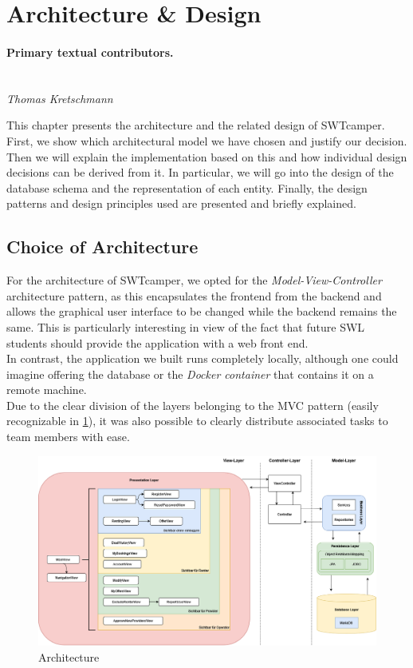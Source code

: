 \section{Architecture \& Design}
\label{sec:architecture_design}

\paragraph{Primary textual contributors.}
\mbox{}\\\emph{Thomas Kretschmann}

This chapter presents the architecture and the related design of SWTcamper. First, we show which architectural model we have chosen and justify our decision. Then we will explain the implementation based on this and how individual design decisions can be derived from it. In particular, we will go into the design of the database schema and the representation of each entity. Finally, the design patterns and design principles used are presented and briefly explained.

\subsection{Choice of Architecture}
For the architecture of SWTcamper, we opted for the \textit{Model-View-Controller} architecture pattern, as this encapsulates the frontend from the backend and allows the graphical user interface to be changed while the backend remains the same. This is particularly interesting in view of the fact that future SWL students should provide the application with a web front end. \\
In contrast, the application we built runs completely locally, although one could imagine offering the database or the \textit{Docker container} that contains it on a remote machine. \\
Due to the clear division of the layers belonging to the MVC pattern (easily recognizable in \ref{fig:architecture}), it was also possible to clearly distribute associated tasks to team members with ease.

\begin{figure}[h]
	\centering
	\includegraphics[width=15cm]{resources/images/architecture.drawio.png}
	\caption{Architecture}
	\label{fig:architecture}
\end{figure}

